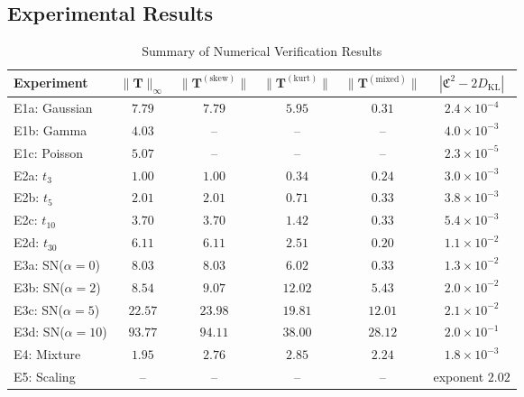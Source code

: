 \documentclass[12pt,a4paper]{article}
\theoremstyle{plain}
\theoremstyle{definition}
\theoremstyle{remark}
\newcommand{\DKL}{D_{\mathrm{KL}}}
\newcommand{\CercisScore}{\mathfrak{C}}
\newcommand{\ACT}{\mathbf{T}}    %
\begin{document}
\subsection{Experimental Results}

\begin{table}[h]
\centering
\caption{Summary of Numerical Verification Results}
\label{tab:results}
\begin{tabular}{@{}lccccc@{}}
\toprule
\textbf{Experiment} &
$\|\ACT\|_{\infty}$ &
$\|\ACT^{(\mathrm{skew})}\|$ &
$\|\ACT^{(\mathrm{kurt})}\|$ &
$\|\ACT^{(\mathrm{mixed})}\|$ &
$|\CercisScore^2 - 2\DKL|$ \\
\midrule
E1a: Gaussian & $7.79$ & $7.79$ & $5.95$ & $0.31$ & $2.4\times 10^{-4}$ \\
E1b: Gamma & $4.03$ & -- & -- & -- & $4.0\times 10^{-3}$ \\
E1c: Poisson & $5.07$ & -- & -- & -- & $2.3\times 10^{-5}$ \\
\midrule
E2a: $t_3$ & $1.00$ & $1.00$ & $0.34$ & $0.24$ & $3.0\times 10^{-3}$ \\
E2b: $t_5$ & $2.01$ & $2.01$ & $0.71$ & $0.33$ & $3.8\times 10^{-3}$ \\
E2c: $t_{10}$ & $3.70$ & $3.70$ & $1.42$ & $0.33$ & $5.4\times 10^{-3}$ \\
E2d: $t_{30}$ & $6.11$ & $6.11$ & $2.51$ & $0.20$ & $1.1\times 10^{-2}$ \\
\midrule
E3a: SN($\alpha=0$) & $8.03$ & $8.03$ & $6.02$ & $0.33$ & $1.3\times 10^{-2}$ \\
E3b: SN($\alpha=2$) & $8.54$ & $9.07$ & $12.02$ & $5.43$ & $2.0\times 10^{-2}$ \\
E3c: SN($\alpha=5$) & $22.57$ & $23.98$ & $19.81$ & $12.01$ & $2.1\times 10^{-2}$ \\
E3d: SN($\alpha=10$) & $93.77$ & $94.11$ & $38.00$ & $28.12$ & $2.0\times 10^{-1}$ \\
\midrule
E4: Mixture & $1.95$ & $2.76$ & $2.85$ & $2.24$ & $1.8\times 10^{-3}$ \\
\midrule
E5: Scaling & -- & -- & -- & -- & exponent $2.02$ \\
\bottomrule
\end{tabular}


\end{table}
\end{document}
